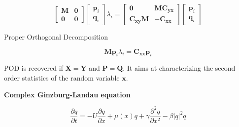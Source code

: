 \documentclass[aspectratio=169]{beamer}
\begin{document}
\begin{frame}
  \vfill

  \Large
  \[
  \begin{bmatrix}
    \bm{M} & \bm{0} \\
    \bm{0} & \bm{0}
  \end{bmatrix}
  \begin{bmatrix}
    \bm{p}_i \\ \bm{q}_i
  \end{bmatrix}
  \lambda_i
  =
  \begin{bmatrix}
    \bm{0} & \bm{M} \bm{C}_{\bm{yx}} \\
    \bm{C}_{\bm{xy}} \bm{M} & - \bm{C}_{\bm{xx}}
  \end{bmatrix}
  \begin{bmatrix}
    \bm{p}_i \\ \bm{q}_i
  \end{bmatrix}
  \]

  \vfill
\end{frame}

\begin{frame}{Proper Orthogonal Decomposition}
  \vfill

  \begin{minipage}{.38\textwidth}
    \begin{tcolorbox}[
        enhanced,
        coltitle=black,
        coltext=white,
        colback=black,
        title=\textbf{POD eigenproblem},
        frame style tile={width=\paperwidth}{background.jpg}
      ]
      \large
      \[
      \bm{M} \bm{p}_i \lambda_i = \bm{C}_{\bm{xx}} \bm{p}_i
      \]

      \smallskip
    \end{tcolorbox}
  \end{minipage}%
  \hfill
  \begin{minipage}{.58\textwidth}
    POD is recovered if $\bm{X} = \bm{Y}$ and $\bm{P} = \bm{Q}$.
    It aims at characterizing the second order statistics of the random variable $\bm{x}$.
  \end{minipage}

  \vfill
\end{frame}

\begin{frame}
  \vfill

  \begin{minipage}{.48\textwidth}

    \centering
    \textbf{Complex Ginzburg-Landau equation}

    \[
    \dfrac{\partial q}{\partial t} = -U \dfrac{\partial q}{\partial x} + \mu(x) q + \gamma \dfrac{\partial^2 q}{\partial x^2} - \beta \vert q \vert^2 q
    \]
  \end{minipage}%
  \hfill
  \begin{minipage}{.48\textwidth}
  \end{minipage}

  \vfill
\end{frame}
\end{document}
